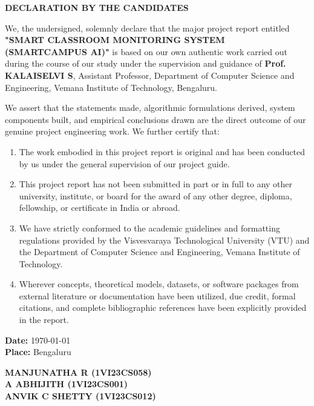 \newpage
{}
\setcounter{page}{1}

\begin{center}
{\fontsize{14pt}{18pt}\selectfont \textbf{DECLARATION BY THE CANDIDATES}}\\[3mm]
\end{center}

\onehalfspacing
\justifying
\noindent We, the undersigned, solemnly declare that the major project report entitled \textbf{"SMART CLASSROOM MONITORING SYSTEM (SMARTCAMPUS AI)"} is based on our own authentic work carried out during the course of our study under the supervision and guidance of \textbf{Prof. KALAISELVI S}, Assistant Professor, Department of Computer Science and Engineering, Vemana Institute of Technology, Bengaluru.

\noindent We assert that the statements made, algorithmic formulations derived, system components built, and empirical conclusions drawn are the direct outcome of our genuine project engineering work. We further certify that:

\begin{enumerate}
    \item The work embodied in this project report is original and has been conducted by us under the general supervision of our project guide.
    \item This project report has not been submitted in part or in full to any other university, institute, or board for the award of any other degree, diploma, fellowship, or certificate in India or abroad.
    \item We have strictly conformed to the academic guidelines and formatting regulations provided by the Visvesvaraya Technological University (VTU) and the Department of Computer Science and Engineering, Vemana Institute of Technology.
    \item Wherever concepts, theoretical models, datasets, or software packages from external literature or documentation have been utilized, due credit, formal citations, and complete bibliographic references have been explicitly provided in the report.
\end{enumerate}

\vspace{0.4in}
\begin{flushleft}
\textbf{Date:} \today \\
\textbf{Place:} Bengaluru
\end{flushleft}

\vspace{-0.6in}
\begin{flushright}
\textbf{MANJUNATHA R (1VI23CS058)}\\[2mm]
\textbf{A ABHIJITH (1VI23CS001)}\\[2mm]
\textbf{ANVIK C SHETTY (1VI23CS012)}
\end{flushright}
\newpage
